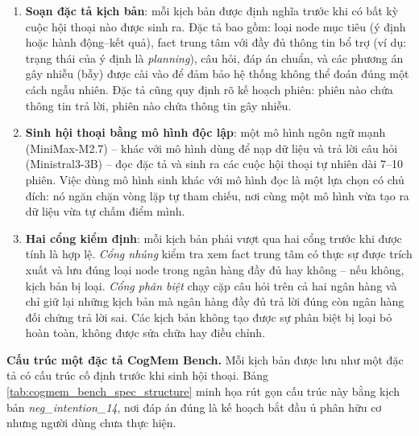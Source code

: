 \documentclass[../main.tex]{subfiles}
\begin{document}
\begin{enumerate}
    \item \textbf{Soạn đặc tả kịch bản}: mỗi kịch bản được định nghĩa trước khi có bất kỳ cuộc hội thoại nào được sinh ra. Đặc tả bao gồm: loại node mục tiêu (ý định hoặc hành động--kết quả), fact trung tâm với đầy đủ thông tin bổ trợ (ví dụ: trạng thái của ý định là \textit{planning}), câu hỏi, đáp án chuẩn, và các phương án gây nhiễu (bẫy) được cài vào để đảm bảo hệ thống không thể đoán đúng một cách ngẫu nhiên. Đặc tả cũng quy định rõ kế hoạch phiên: phiên nào chứa thông tin trả lời, phiên nào chứa thông tin gây nhiễu.
    \item \textbf{Sinh hội thoại bằng mô hình độc lập}: một mô hình ngôn ngữ mạnh (MiniMax-M2.7) -- khác với mô hình dùng để nạp dữ liệu và trả lời câu hỏi (Ministral3-3B) -- đọc đặc tả và sinh ra các cuộc hội thoại tự nhiên dài 7--10 phiên. Việc dùng mô hình sinh khác với mô hình đọc là một lựa chọn có chủ đích: nó ngăn chặn vòng lặp tự tham chiếu, nơi cùng một mô hình vừa tạo ra dữ liệu vừa tự chấm điểm mình.
    \item \textbf{Hai cổng kiểm định}: mỗi kịch bản phải vượt qua hai cổng trước khi được tính là hợp lệ. \textit{Cổng nhúng} kiểm tra xem fact trung tâm có thực sự được trích xuất và lưu đúng loại node trong ngân hàng đầy đủ hay không -- nếu không, kịch bản bị loại. \textit{Cổng phân biệt} chạy cặp câu hỏi trên cả hai ngân hàng và chỉ giữ lại những kịch bản mà ngân hàng đầy đủ trả lời đúng còn ngân hàng đối chứng trả lời sai. Các kịch bản không tạo được sự phân biệt bị loại bỏ hoàn toàn, không được sửa chữa hay điều chỉnh.
\end{enumerate}

\textbf{Cấu trúc một đặc tả CogMem Bench.} Mỗi kịch bản được lưu như một đặc tả có cấu trúc cố định trước khi sinh hội thoại. Bảng \ref{tab:cogmem_bench_spec_structure} minh họa rút gọn cấu trúc này bằng kịch bản \textit{neg\_intention\_14}, nơi đáp án đúng là kế hoạch bắt đầu ủ phân hữu cơ nhưng người dùng chưa thực hiện.
\end{document}
